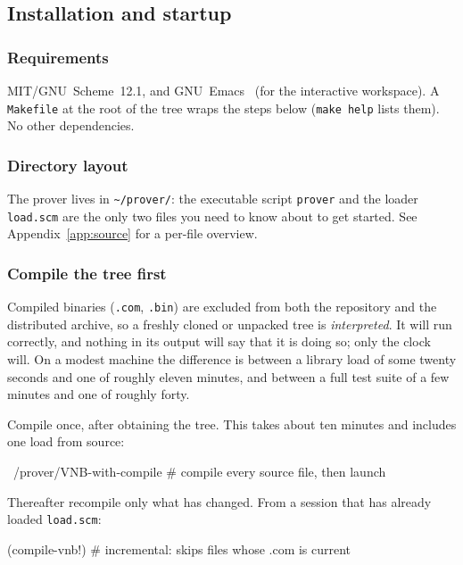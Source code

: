 \subsection{Installation and startup}

\subsubsection{Requirements}

MIT/GNU~Scheme~12.1, and GNU~Emacs~\cite{Emacs} (for the interactive workspace).
A \texttt{Makefile} at the root of the tree wraps the steps below
(\texttt{make help} lists them).
No other dependencies.

\subsubsection{Directory layout}

The prover lives in \texttt{\textasciitilde/prover/}: the executable
script \texttt{prover} and the loader \texttt{load.scm} are the only
two files you need to know about to get started.  See
Appendix~\ref{app:source} for a per-file overview.

\subsubsection{Compile the tree first}
\label{sec:compile-first}

Compiled binaries (\texttt{.com}, \texttt{.bin}) are excluded from both the
repository and the distributed archive, so a freshly cloned or unpacked tree is
\emph{interpreted}.  It will run correctly, and nothing in its output will say
that it is doing so; only the clock will.  On a modest machine the difference is
between a library load of some twenty seconds and one of roughly eleven minutes,
and between a full test suite of a few minutes and one of roughly forty.

Compile once, after obtaining the tree.  This takes about ten minutes and
includes one load from source:

\begin{VNBsnip}
~/prover/VNB-with-compile    # compile every source file, then launch
\end{VNBsnip}

Thereafter recompile only what has changed.  From a session that has already
loaded \texttt{load.scm}:

\begin{VNBsnip}
(compile-vnb!)               # incremental: skips files whose .com is current
\end{VNBsnip}

